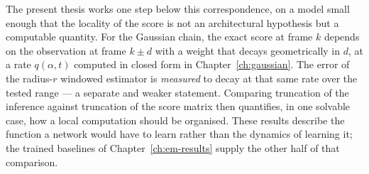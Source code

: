 The present thesis works one step below this correspondence, on a model
small enough that the locality of the score is not an architectural
hypothesis but a computable quantity. For the Gaussian chain, the exact
score at frame $k$ depends on the observation at frame $k \pm d$ with a
weight that decays geometrically in $d$, at a rate $q(\alpha, t)$
computed in closed form in Chapter~\ref{ch:gaussian}. The error of the
radius-$r$ windowed estimator is \emph{measured} to decay at that same rate
over the tested range --- a separate and weaker statement. Comparing
truncation of the inference against truncation of the score matrix then
quantifies, in one solvable case, how a local computation should be
organised. These results describe the function a network would have to
learn rather than the dynamics of learning it; the trained baselines of
Chapter~\ref{ch:em-results} supply the other half of that comparison.
